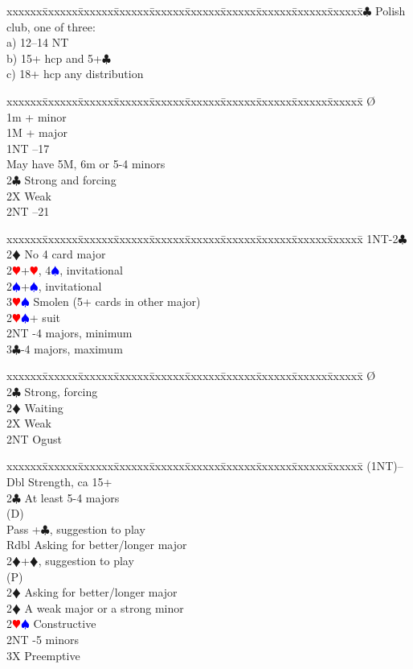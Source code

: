 \documentclass[a4paper]{article}
\newcommand{\BC}{\textcolor{OliveGreen}{$\clubsuit$}}
\newcommand{\BD}{\textcolor{RedOrange}{$\vardiamondsuit$}}
\newcommand{\BH}{\textcolor{Red}{$\varheartsuit${}}}
\newcommand{\BS}{\textcolor{Blue}{$\spadesuit${}}}
\newenvironment{bidtable}
{\begin{tabbing}

xxxxxx\=xxxxxx\=xxxxxx\=xxxxxx\=xxxxxx\=xxxxxx\=xxxxxx\=xxxxxx\=xxxxxx\=xxxxxx\=\kill}
{\end{tabbing} }%
\begin{document}
\begin{bidtable}
1\BC \> Polish club, one of three:\\
\>a) 12--14 NT\\
\>b) 15+ hcp and 5+\BC \\
\>c) 18+ hcp any distribution
\end{bidtable}

\begin{bidtable}
\O\+\\
1m + minor\\
1M + major\\
1NT --17\\
\>May have 5M, 6m or 5-4 minors\\
2\BC \> Strong and forcing\\
2X \> Weak\\
2NT --21\-
\end{bidtable}

\begin{bidtable}
1NT-2\BC\+\\
2\BD \> No 4 card major\+\\
2\BH {}+\BH , 4\BS , invitational\\
2\BS {}+\BS , invitational\\
3\BH\BS \> Smolen (5+ cards in other major)\-\\
2\BH\BS {}+ suit\\
2NT -4 majors, minimum\\
3\BC {}-4 majors, maximum\-
\end{bidtable}

\begin{bidtable}
\O\+\\
2\BC \> Strong, forcing\+\\
2\BD \> Waiting\-\\
2X \> Weak\+\\
2NT \> Ogust\-\-
\end{bidtable}

\begin{bidtable}
(1NT)--\+\\
Dbl \> Strength, ca 15+\\
2\BC \> At least 5-4 majors\+\\
(D)\+\\
Pass +\BC , suggestion to play\\
Rdbl \> Asking for better/longer major\\
2\BD {}+\BD , suggestion to play\-\\
(P)\+\\
2\BD \> Asking for better/longer major\-\-\\
2\BD \> A weak major or a strong minor\\
2\BH\BS \> Constructive\\
2NT -5 minors\\
3X \> Preemptive\-
\end{bidtable}
\end{document}
